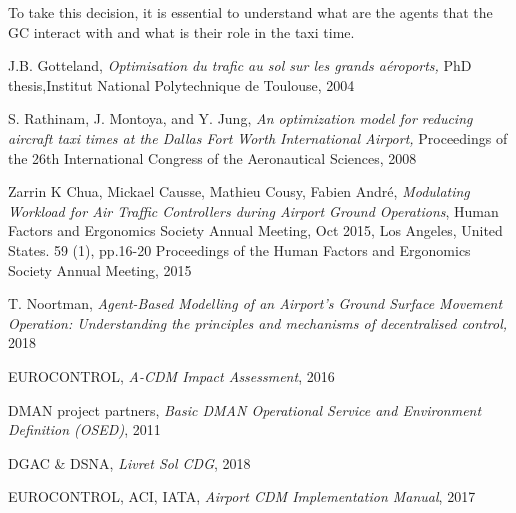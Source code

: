 \documentclass{article}
\begin{document}
To take this decision, it is essential to understand what are the agents that the GC interact with and what is their role in the taxi time.



\begin{thebibliography}{9}
	
	J.B. Gotteland,
	\textit{Optimisation du trafic au sol sur les grands aéroports,}
	PhD thesis,Institut National Polytechnique de Toulouse, 
	2004
	
	S. Rathinam, J. Montoya, and Y. Jung, 
	\textit{An optimization model for reducing aircraft taxi times at the Dallas Fort Worth International Airport,}
	Proceedings of the 26th International Congress of the Aeronautical Sciences, 
	2008
	
	Zarrin  K  Chua,  Mickael  Causse,  Mathieu  Cousy, Fabien  André,
	\textit{Modulating   Workload   for   Air   Traffic   Controllers   during   Airport Ground  Operations},
	Human  Factors  and  Ergonomics  Society Annual Meeting,  Oct  2015,  Los  Angeles,  United  States.  59  (1),  pp.16-20 Proceedings  of  the  Human  Factors  and  Ergonomics  Society  Annual Meeting, 
	2015
	
	T. Noortman,
	\textit{Agent-Based Modelling of an Airport’s Ground Surface Movement Operation: Understanding the principles and mechanisms of decentralised control,}
	2018
	
	EUROCONTROL,
	\textit{A-CDM Impact Assessment}, 
	2016
	
	DMAN project partners,
	\textit{Basic DMAN Operational Service and Environment Definition (OSED)},
	2011
	
	DGAC \& DSNA,
	\textit{Livret Sol CDG},
	2018
	
	EUROCONTROL, ACI, IATA,
	\textit{Airport CDM Implementation Manual},
	2017
\end{thebibliography}
	
	
\end{document}
